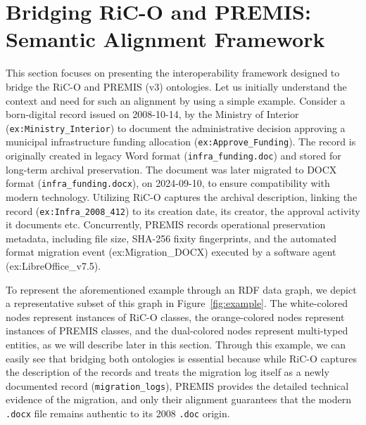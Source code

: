 \documentclass[runningheads]{llncs}
\begin{document}
%

\section{Bridging RiC-O and PREMIS: Semantic Alignment Framework}
\label{sec:alignment-framework}


This section focuses on presenting the interoperability framework designed to bridge the RiC-O and PREMIS (v3) ontologies. Let us initially understand the context and need for such an alignment by using a simple example. 
Consider a born-digital record issued on 2008-10-14, by the Ministry of Interior (\texttt{ex:Ministry\_Interior}) to document the administrative decision approving a municipal infrastructure funding allocation (\texttt{ex:Approve\_Funding}). The record is originally created in legacy Word format (\texttt{infra\_funding.doc}) and stored for long-term archival preservation. The document was later migrated to DOCX format (\texttt{infra\_funding.docx}), on 2024-09-10, to ensure compatibility with modern technology. Utilizing RiC-O captures the archival description, linking the record (\texttt{ex:Infra\_2008\_412}) to its creation date, its creator, the approval activity it documents etc. Concurrently, PREMIS records operational preservation metadata, including file size, SHA-256 fixity fingerprints, and the automated format migration event (ex:Migration\_DOCX) executed by a software agent (ex:LibreOffice\_v7.5). 

To represent the aforementioned example through an RDF data graph, we depict a representative subset of this graph in Figure~\ref{fig:example}.
The white-colored nodes represent instances of RiC-O classes, the orange-colored nodes represent instances of PREMIS classes, and the dual-colored nodes
represent multi-typed entities, as we will describe later in this section. Through this example, we can easily see that  
bridging both ontologies is essential because while RiC-O captures the description of the records and treats the migration log itself as a newly documented record (\texttt{migration\_logs}), PREMIS provides the detailed technical evidence of the migration, and only their alignment guarantees that the modern \texttt{.docx} file remains  authentic to its 2008 \texttt{.doc} origin.
\end{document}
